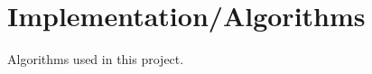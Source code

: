 \chapter{Implementation/Algorithms}
\label{ap:Algorithms}
\graphicspath{{Appendix4/Appendix4figures/}}

Algorithms used in this project.

